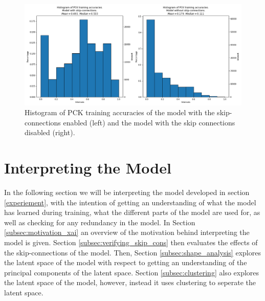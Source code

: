 \documentclass[./main.tex]{subfiles}
\begin{document}
\begin{figure}[htbp]
    \centering
    \includegraphics[height = 6 cm]{entities/PCK_accs_vs.png}
    \caption{Histogram of PCK training accuracies of the model with the skip-connections enabled (left) and the model with the skip connections disabled (right).}
    \label{fig:PCK_accs}
\end{figure}

\section{Interpreting the Model}\label{sec:XAI}
In the following section we will be interpreting the model developed in section \ref{experiement}, with the intention of getting an understanding of what the model has learned during training, what the different parts of the model are used for, as well as checking for any redundancy in the model. In Section \ref{subsec:motivation_xai} an overview of the motivation behind interpreting the model is given. Section \ref{subsec:verifying_skip_cons} then evaluates the effects of the skip-connections of the model. Then, Section \ref{subsec:shape_analysis} explores the latent space of the model with respect to getting an understanding of the principal components of the latent space. Section \ref{subsec:clustering} also explores the latent space of the model, however, instead it uses clustering to seperate the latent space.
\end{document}
